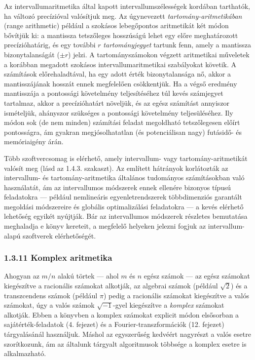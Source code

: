 \documentclass[
  magyar,
  11pt]{article}
\begin{document}
Az intervallumaritmetika által kapott intervallumszélességek kordában
tarthatók, ha változó precízióval valósítjuk meg. Az úgynevezett
\emph{tartomány-aritmetikában} (range arithmetic) például a szokásos
lebegőpontos aritmetikát két módon bővítjük ki: a mantissza tetszőleges
hosszúságú lehet egy előre meghatározott precízióhatárig, és egy további
\(r\) \emph{tartományjegyet} tartunk fenn, amely a mantissza
bizonytalanságát (\(\pm r\)) jelzi. A tartományszámokon végzett
aritmetikai műveletek a korábban megadott szokásos
intervallumaritmetikai szabályokat követik. A számítások
előrehaladtával, ha egy adott érték bizonytalansága nő, akkor a
mantisszájának hosszát ennek megfelelően csökkentjük. Ha a végső
eredmény mantisszája a pontossági követelmény teljesítéséhez túl kevés
számjegyet tartalmaz, akkor a precízióhatárt növeljük, és az egész
számítást annyiszor ismételjük, ahányszor szükséges a pontossági
követelmény teljesüléséhez. Ily módon sok (de nem minden) számítási
feladat megoldható tetszőlegesen előírt pontosságra, ám gyakran
megjósolhatatlan (és potenciálisan nagy) futásidő- és memóriaigény árán.

Több szoftvercsomag is elérhető, amely intervallum- vagy
tartomány-aritmetikát valósít meg (lásd az 1.4.3. szakaszt). Az említett
hátrányok korlátozták az intervallum- és tartomány-aritmetika általános
tudományos számításokban való használatát, ám az intervallumos módszerek
ennek ellenére bizonyos típusú feladatokra --- például nemlineáris
egyenletrendszerek többdimenziós garantált megoldási módszereire és
globális optimalizálási feladatokra --- a kevés elérhető lehetőség
egyikét nyújtják. Bár az intervallumos módszerek részletes bemutatása
meghaladja e könyv kereteit, a megfelelő helyeken jelezni fogjuk az
intervallum-alapú szoftverek elérhetőségét.

\subsubsection{1.3.11 Komplex aritmetika}\label{komplex-aritmetika}

Ahogyan az \(m/n\) alakú törtek --- ahol \(m\) és \(n\) egész számok ---
az egész számokat kiegészítve a racionális számokat alkotják, az
algebrai számok (például \(\sqrt{2}\)) és a transzcendens számok
(például \(\pi\)) pedig a racionális számokat kiegészítve a valós
számokat, úgy a valós számok \(\sqrt{-1}\)-gyel kiegészítve a
\emph{komplex} számokat alkotják. Ebben a könyvben a komplex számokat
explicit módon elsősorban a sajátérték-feladatok (4. fejezet) és a
Fourier-transzformációk (12. fejezet) tárgyalásánál használjuk. Máshol
az egyszerűség kedvéért nagyrészt a valós esetre szorítkozunk, ám az
általunk tárgyalt algoritmusok többsége a komplex esetre is
alkalmazható.
\end{document}
